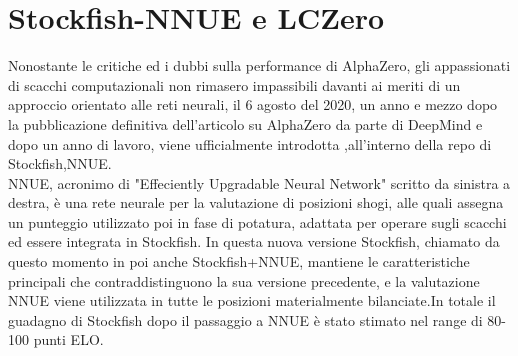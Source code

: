 \section{Stockfish-NNUE e LCZero}
Nonostante le critiche ed i dubbi sulla performance di AlphaZero, gli appassionati di scacchi computazionali non rimasero impassibili davanti ai meriti di un approccio orientato alle reti neurali,
il 6 agosto del 2020, un anno e mezzo dopo la pubblicazione definitiva dell'articolo su AlphaZero da parte di DeepMind e dopo un anno di lavoro, viene ufficialmente introdotta ,all'interno della repo di Stockfish,NNUE.
\\NNUE, acronimo di "Effeciently Upgradable Neural Network" scritto da sinistra a destra, è una rete neurale per la valutazione di posizioni shogi, alle quali assegna un punteggio
utilizzato poi in fase di potatura, adattata per operare sugli scacchi ed essere integrata in Stockfish.
In questa nuova versione Stockfish, chiamato da questo momento in poi anche Stockfish+NNUE, mantiene le caratteristiche principali che contraddistinguono la sua versione precedente, e la valutazione NNUE viene
utilizzata in tutte le posizioni materialmente bilanciate.In totale il guadagno di Stockfish dopo il passaggio a NNUE è stato stimato nel range di 80-100 punti ELO.

